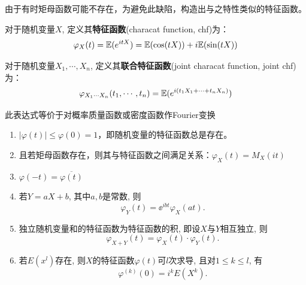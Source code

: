 由于有时矩母函数可能不存在，为避免此缺陷，构造出与之特性类似的特征函数。

\begin{definition}
    对于随机变量$X$, 定义其\textbf{特征函数}(characat function, chf)为：
    \[ \varphi_X(t) = \mathbb{E}(e^{itX}) = \mathbb{E}(\cos(tX)) + i\mathbb{E}(\sin(tX))\]

    对于随机变量$X_1,\cdots, X_n$, 定义其\textbf{联合特征函数}(joint characat function, joint chf)为：
    \[ \varphi_{X_1\cdots X_n}(t_1,\cdots ,t_n) = \mathbb{E}(e^{i(t_1 X_1+\cdots + t_n X_n)}) \]
\end{definition}
\begin{remark}
    此表达式等价于对概率质量函数或密度函数作Fourier变换
\end{remark}

\begin{proposition}[特征函数的性质]
    \begin{enumerate}
        \item$\lvert \varphi(t) \rvert \leq \varphi(0) = 1$，即随机变量的特征函数总是存在。
        \item 且若矩母函数存在，则其与特征函数之间满足关系：$\varphi_X(t) = M_X(it)$
              \item$\varphi(-t) = \overline{\varphi(t)}$
        \item 若$Y = aX + b$, 其中$a,b$是常数, 则
              \begin{equation}\label{eq:chf_linear}
                  \varphi_Y(t) = \ee^{ibt} \varphi_X(at).
              \end{equation}
        \item 独立随机变量和的特征函数为特征函数的积,
              即设$X$与$Y$相互独立, 则
              \begin{equation}\label{eq:chf_sum}
                  \varphi_{X+Y}(t) = \varphi_X(t) \cdot \varphi_Y(t).
              \end{equation}
        \item 若$E(x^l)$存在,
              则$X$的特征函数$\varphi(t)$可$l$次求导,
              且对$1 \leq k \leq l$, 有
              \begin{equation}\label{eq:chf_derivative}
                  \varphi^{(k)}(0) = i^k E(X^k).
              \end{equation}
    \end{enumerate}
\end{proposition}
